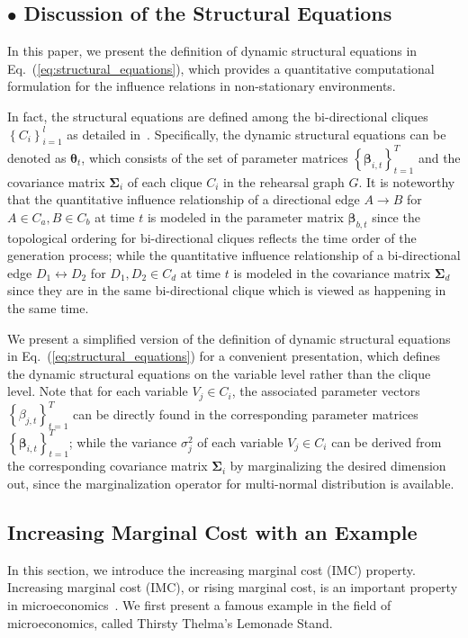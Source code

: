 \documentclass{article}
\theoremstyle{plain}
\theoremstyle{definition}
\theoremstyle{remark}
\def \Eq {Eq.}
\begin{document}
\subsection*{$\bullet$ Discussion of the Structural Equations}

In this paper, we present the definition of dynamic structural equations in \Eq~(\ref{eq:structural_equations}), which provides a quantitative computational formulation for the influence relations in non-stationary environments.

In fact, the structural equations are defined among the bi-directional cliques $\left\{C_i\right\}_{i=1}^l$ as detailed in~\citet{qint2023srm}.
Specifically, the dynamic structural equations can be denoted as $\bm{\theta}_t$, which consists of the set of parameter matrices $\left\{\bm{\beta}_{i,t}\right\}_{t=1}^T$ and the covariance matrix $\bm{\Sigma}_i$ of each clique $C_i$ in the rehearsal graph $G$. It is noteworthy that the quantitative influence relationship of a directional edge $A\rightarrow B$ for $A\in C_a, B\in C_b$ at time $t$ is modeled in the parameter matrix $\bm{\beta}_{b, t}$ since the topological ordering for bi-directional cliques reflects the time order of the generation process; while the quantitative influence relationship of a bi-directional edge $D_1\leftrightarrow D_2$ for $D_1, D_2\in C_d$ at time $t$ is modeled in the covariance matrix $\bm{\Sigma}_d$ since they are in the same bi-directional clique which is viewed as happening in the same time. 

We present a simplified version of the definition of dynamic structural equations in \Eq~(\ref{eq:structural_equations}) for a convenient presentation, which defines the dynamic structural equations on the variable level rather than the clique level. 
Note that for each variable $V_j\in C_i$, the associated parameter vectors $\left\{\beta_{j,t}\right\}_{t=1}^T$ can be directly found in the corresponding parameter matrices $\left\{\bm{\beta}_{i,t}\right\}_{t=1}^T$; while the variance $\sigma_j^2$ of each variable $V_j\in C_i$ can be derived from the corresponding covariance matrix $\bm{\Sigma}_i$ by marginalizing the desired dimension out, since the marginalization operator for multi-normal distribution is available.




\subsection{Increasing Marginal Cost with an Example}
\label{app:imc}
In this section, we introduce the increasing marginal cost (IMC) property. 
Increasing marginal cost (IMC), or rising marginal cost, is an important property in microeconomics~\citep{LANCKER2019104, mankiw2020economics}. 
We first present a famous example in the field of microeconomics, called Thirsty Thelma's Lemonade Stand.
\end{document}
